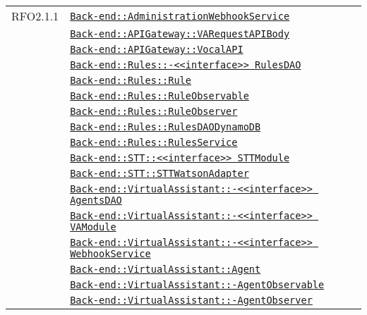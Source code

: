 \begin{longtable}{|>{\centering}m{3cm}|m{10cm}<{\centering}|}
RFO2.1.1 & \hyperref[Back-end::AdministrationWebhookService]{\texttt{Back-end::AdministrationWebhookService}}\\
& \hyperref[Back-end::APIGateway::VARequestAPIBody]{\texttt{Back-end::APIGateway::VARequestAPIBody}}\\
& \hyperref[Back-end::APIGateway::VocalAPI]{\texttt{Back-end::APIGateway::VocalAPI}}\\
& \hyperref[Back-end::Rules::<<interface>> RulesDAO]{\texttt{Back-end::Rules::-\linebreak <<interface>> RulesDAO}}\\
& \hyperref[Back-end::Rules::Rule]{\texttt{Back-end::Rules::Rule}}\\
& \hyperref[Back-end::Rules::RuleObservable]{\texttt{Back-end::Rules::RuleObservable}}\\
& \hyperref[Back-end::Rules::RuleObserver]{\texttt{Back-end::Rules::RuleObserver}}\\
& \hyperref[Back-end::Rules::RulesDAODynamoDB]{\texttt{Back-end::Rules::RulesDAODynamoDB}}\\
& \hyperref[Back-end::Rules::RulesService]{\texttt{Back-end::Rules::RulesService}}\\
& \hyperref[Back-end::STT::<<interface>> STTModule]{\texttt{Back-end::STT::<<interface>> STTModule}}\\
& \hyperref[Back-end::STT::STTWatsonAdapter]{\texttt{Back-end::STT::STTWatsonAdapter}}\\
& \hyperref[Back-end::VirtualAssistant::<<interface>> AgentsDAO]{\texttt{Back-end::VirtualAssistant::-\linebreak <<interface>> AgentsDAO}}\\
& \hyperref[Back-end::VirtualAssistant::<<interface>> VAModule]{\texttt{Back-end::VirtualAssistant::-\linebreak <<interface>> VAModule}}\\
& \hyperref[Back-end::VirtualAssistant::<<interface>> WebhookService]{\texttt{Back-end::VirtualAssistant::-\linebreak <<interface>> WebhookService}}\\
& \hyperref[Back-end::VirtualAssistant::Agent]{\texttt{Back-end::VirtualAssistant::Agent}}\\
& \hyperref[Back-end::VirtualAssistant::AgentObservable]{\texttt{Back-end::VirtualAssistant::-\linebreak AgentObservable}}\\
& \hyperref[Back-end::VirtualAssistant::AgentObserver]{\texttt{Back-end::VirtualAssistant::-\linebreak AgentObserver}}\\

\end{longtable}
